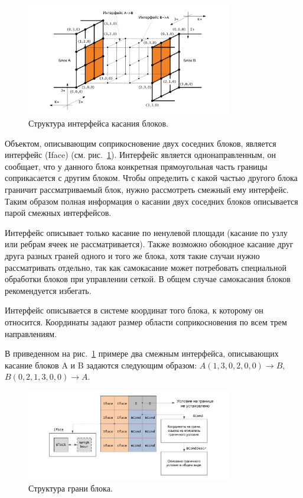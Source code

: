 \begin{figure}[ht]
\centering
\includegraphics[width=0.8\textwidth]{fig/par_7-iface.pdf}
\singlespacing
{}\caption{Структура интерфейса касания блоков.}
\label{fig:text_2_block_iface}
\end{figure}

Объектом, описывающим соприкосновение двух соседних блоков, является интерфейс (Iface) (см. рис.~\ref{fig:text_2_block_iface}).
Интерфейс является однонаправленным, он сообщает, что у данного блока конкретная прямоугольная часть границы соприкасается с другим блоком.
Чтобы определить с какой частью другого блока граничит рассматриваемый блок, нужно рассмотреть смежный ему интерфейс.
Таким образом полная информация о касании двух соседних блоков описывается парой смежных интерфейсов.

Интерфейс описывает только касание по ненулевой площади (касание по узлу или ребрам ячеек не рассматривается).
Также возможно обоюдное касание друг друга разных граней одного и того же блока, хотя такие случаи нужно рассматривать отдельно, так как самокасание может потребовать специальной обработки блоков при управлении сеткой.
В общем случае самокасания блоков рекомендуется избегать.

Интерфейс описывается в системе координат того блока, к которому он относится.
Координаты задают размер области соприкосновения по всем трем направлениям.

В приведенном на рис.~\ref{fig:text_2_block_iface} примере два смежным интерфейса, описывающих касание блоков A и B задаются следующим образом: $A(1, 3, 0, 2, 0, 0) \rightarrow B$, $B(0, 2, 1, 3, 0, 0) \rightarrow A$.

\begin{figure}[ht]
\centering
\includegraphics[width=0.8\textwidth]{fig/par_8-facet.pdf}
\singlespacing
{}\caption{Структура грани блока.}
\label{fig:text_2_block_facet}
\end{figure}

